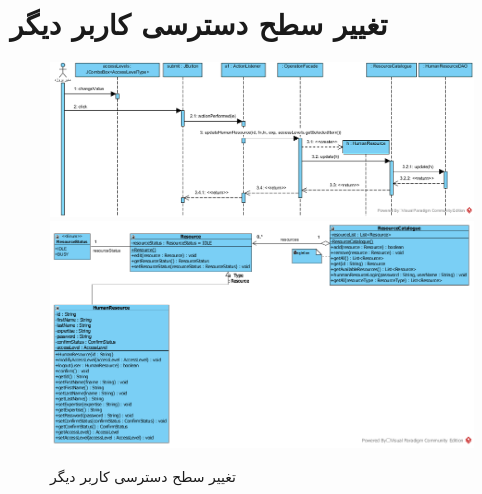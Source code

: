 \section{تغییر سطح دسترسی کاربر دیگر}
\begin{figure}[H]
	\centering
	\includegraphics[scale=0.59]{img/sequence-design/ChangeAccessLevel}
	\includegraphics[scale=0.7]{img/sequence-design/ChangeAccessLevelC}
	\caption{تغییر سطح دسترسی کاربر دیگر}
\end{figure}

